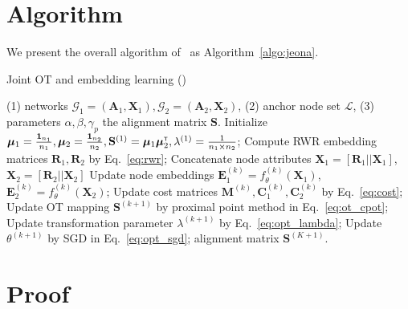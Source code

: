 \appendix

\vspace{-5pt}
\section{Algorithm}\label{app:algo}
We present the overall algorithm of \algname\ as Algorithm~\ref{algo:jeona}.
\begin{algorithm}[h]
    \caption{Joint OT and embedding learning (\algname)}
    \begin{algorithmic}[1]\label{algo:jeona}
        \REQUIRE (1) networks $\mathcal{G}_1=(\mathbf{A}_1,\mathbf{X}_1), \mathcal{G}_2=(\mathbf{A}_2,\mathbf{X}_2)$, (2) anchor node set $\mathcal{L}$, (3) parameters $\alpha,\beta,\gamma_p$
        \ENSURE the alignment matrix $\mathbf{S}$.
        \STATE Initialize $\bm{\mu}_1 = \frac{\mathbf{1}_{n_1}}{n_1}, \bm{\mu}_2 = \frac{\mathbf{1}_{n_2}}{n_2},\mathbf{S}^{(1)}=\bm{\mu}_1\bm{\mu}_2^{\scriptscriptstyle\mathsf{T}}, \lambda^{(1)}=\frac{1}{n_1\times n_2}$;
        \STATE Compute RWR embedding matrices $\mathbf{R}_1, \mathbf{R}_2$ by Eq.~\eqref{eq:rwr};
        \STATE Concatenate node attributes $\mathbf{X}_1=[\mathbf{R}_1||\mathbf{X}_1]$, $\mathbf{X}_2=[\mathbf{R}_2||\mathbf{X}_2]$
            \STATE Update node embeddings $\mathbf{E}^{(k)}_1\!=\!f_\theta^{(k)}(\mathbf{X}_1)$, $\mathbf{E}^{(k)}_2\!=\!f_\theta^{(k)}(\mathbf{X}_2)$;
            \STATE Update cost matrices $\mathbf{M}^{(k)}, \mathbf{C}^{(k)}_1, \mathbf{C}^{(k)}_2$ by Eq.~\eqref{eq:cost};
            \STATE Update OT mapping $\mathbf{S}^{(k+1)}$ by proximal point method in Eq.~\eqref{eq:ot_cpot};
            \STATE Update transformation parameter $\lambda^{(k+1)}$ by Eq.~\eqref{eq:opt_lambda};
            \STATE Update $\theta^{(k+1)}$ by SGD in Eq.~\eqref{eq:opt_sgd};
        \ENDFOR
        \RETURN alignment matrix $\mathbf{S}^{(K+1)}$.
    \end{algorithmic}
\end{algorithm}

\vspace{-5pt}
\section{Proof}\label{app:proof}
\vspace{-2pt}

